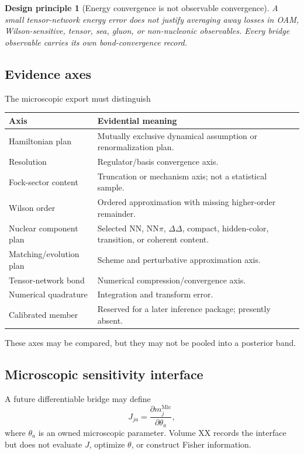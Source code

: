 \documentclass[11pt]{article}
\newtheorem{principle}[definition]{Design principle}
\newcommand{\Mic}{\ensuremath{\mathrm{Mic}}}
\begin{document}
\begin{principle}[Energy convergence is not observable convergence]
A small tensor-network energy error does not justify averaging away losses in OAM, Wilson-sensitive, tensor, sea, gluon, or non-nucleonic observables.  Every bridge observable carries its own bond-convergence record.
\end{principle}

\subsection{Evidence axes}

The microscopic export must distinguish
\begin{center}
\begin{tabularx}{0.94\textwidth}{L{0.30\textwidth}Y}
\toprule
Axis & Evidential meaning\\
\midrule
Hamiltonian plan & Mutually exclusive dynamical assumption or renormalization plan.\\
Resolution & Regulator/basis convergence axis.\\
Fock-sector content & Truncation or mechanism axis; not a statistical sample.\\
Wilson order & Ordered approximation with missing higher-order remainder.\\
Nuclear component plan & Selected NN, NN\(\pi\), \(\Delta\Delta\), compact, hidden-color, transition, or coherent content.\\
Matching/evolution plan & Scheme and perturbative approximation axis.\\
Tensor-network bond & Numerical compression/convergence axis.\\
Numerical quadrature & Integration and transform error.\\
Calibrated member & Reserved for a later inference package; presently absent.\\
\bottomrule
\end{tabularx}
\end{center}

These axes may be compared, but they may not be pooled into a posterior band.

\subsection{Microscopic sensitivity interface}

A future differentiable bridge may define
\begin{equation}
 J_{ja}
 =
 \frac{\partial m_j^{\Mic}}{\partial\theta_a},
 \label{eq:sensitivity}
\end{equation}
where \(\theta_a\) is an owned microscopic parameter.  Volume XX records the interface but does not evaluate \(J\), optimize \(\theta\), or construct Fisher information.
\end{document}
